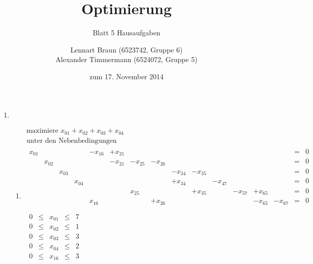 \documentclass[a4paper]{scrartcl}
\title{Optimierung}
\subtitle{Blatt 5 Hausaufgaben}
\author{
	Lennart Braun (6523742, Gruppe 6) \\
    Alexander Timmermann (6524072, Gruppe 5)
}
\date{zum 17. November 2014}
\begin{document}
\maketitle

\begin{enumerate}[label=\bfseries\arabic*.]
    \item %
        \begin{enumerate}
            \item
                \begin{equation}
                    \begin{gathered}
                        \text{maximiere } x_{01} +x_{02} +x_{03} +x_{04} \\
                        \text{unter den Nebenbedingungen} \\
                        \begin{array}{rrrrrrrrrrrrrrcr}
                            x_{01} &  &  &  & -x_{16} & +x_{21} &  &  &  &  &  &  &  &  & = & 0 \\
                            & x_{02} &  &  &  & -x_{21} & -x_{25} & -x_{26} &  &  &  &  &  &  & = & 0 \\
                            &  & x_{03} &  &  &  &  &  & -x_{34} & -x_{35} &  &  &  &  & = & 0 \\
                            &  &  & x_{04} &  &  &  &  & +x_{34} &  & -x_{47} &  &  &  & = & 0 \\
                            &  &  &  &  &  & x_{25} &  &  & +x_{35} &  & -x_{57} & +x_{65} &  & = & 0 \\
                            &  &  &  & x_{16} &  &  & +x_{26} &  &  &  &  & -x_{65} & -x_{67} & = & 0 \\
                        \end{array} \\
                        \begin{array}{rcrcr}
                            0 & \leq & x_{01} & \leq & 7 \\
                            0 & \leq & x_{02} & \leq & 1 \\
                            0 & \leq & x_{03} & \leq & 3 \\
                            0 & \leq & x_{04} & \leq & 2 \\
                            0 & \leq & x_{16} & \leq & 3 \\

\end{array}
\end{gathered}
\end{equation}
\end{enumerate}
\end{enumerate}
\end{document}
